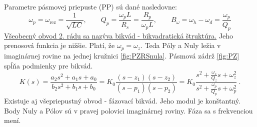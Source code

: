 Parametre pásmovej priepuste (PP) sú dané nasledovne:
\begin{equation}
	\omega_p = \omega_{\text{rez}} = \frac{1}{\sqrt{LC}}, \qquad Q_p = \frac{\omega_p L}{R_s} = \frac{R_p}{\omega_p L},\qquad B_\omega = \omega_h - \omega_d = \frac{\omega_p}{Q_p}
\end{equation}
\underline{Všeobecný obvod 2. rádu sa nazýva bikvád - bikvadratická štruktúra.} Jeho prenosová funkcia je nižšie. Platí, že $\omega_p = \omega_z$. Teda Póly a Nuly ležia v imaginárnej rovine na jednej kružnici \ref{fig:PZRSnula}. Pásmová zádrž \ref{fig:PZ} spĺňa podmienky pre bikvád.
\begin{equation}
	K(s) = \frac{a_2 s^2 + a_1 s + a_0}{b_2 s^2 + b_1 s + b_0} = K_0 \frac{(s - z_1)(s - z_2)}{(s - p_1)(s - p_2)} = K_0 \frac{s^2 + \frac{\omega_z}{Q_z} s + \omega_z^2}{s^2 + \frac{\omega_p}{Q_p} s + \omega_p^2} \ .
\end{equation}
Existuje aj všepriepustný obvod - fázovací bikvád. Jeho modul je konštantný. Body Nuly a Pólov sú v pravej polovici imaginárnej roviny. Fáza sa s frekvenciou mení.

